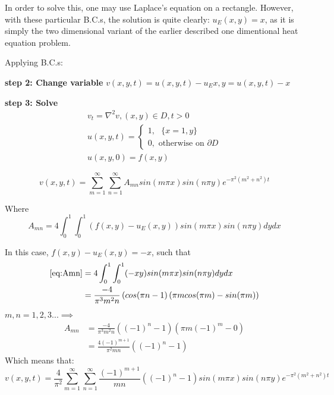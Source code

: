 \documentclass[%
oneside,                 %
final,                   %
10pt]{article}
\begin{document}
In order to solve this, one may use Laplace's equation on a rectangle. However, with these particular B.C.s, the solution is quite clearly:
$u_E(x,y)=x$, as it is simply the two dimensional variant of the earlier described one dimentional heat equation problem. \newline

Applying B.C.s: 


\textbf{step 2: Change variable}
$v(x,y,t)=u(x,y,t)-u_E{x,y}=u(x,y,t)-x$

\textbf{step 3: Solve}
\begin{align}
v_t=\nabla^2 v, (x,y) \in D, t>0 \\
u(x,y,t)=\begin{cases}
1, \text{	} \{x=1,y\} \\
0, \text{ otherwise on } \partial D
\end{cases} \\
u(x,y,0)=f(x,y)
\end{align}

\begin{equation}
v(x,y,t)=\sum_{m=1}^{\infty} \sum_{n=1}^{\infty} A_{mn} sin (m\pi x) sin (n \pi y) e^{-\pi^2(m^2+n^2)t}
\end{equation}

Where 
\begin{equation}
A_{mn}=4 \int_0^1 \int_0^1 \left( f(x,y)-u_E(x,y)\right) sin (m\pi x) sin (n \pi y) dy dx 
\label{eq:Amn}
\end{equation}

In this case, $f(x,y)-u_E(x,y)=-x$, such that\\
\begin{align}
\eqref{eq:Amn}&=4 \int_0^{1} \int_0^{1} (-xy) sin (m \pi x) sin (n \pi y) dy dx \\
&= \frac{-4}{\pi^3 m^2 n} \left(cos(\pi n-1\right) \left( \pi m cos(\pi m)-sin(\pi m)\right)
\end{align}
$m,n=1,2,3... \implies$
\begin{align}
A_{mn}&=\frac{-4}{\pi^3 m^2 n} \left( (-1)^n-1\right) \left( \pi m (-1)^m-0\right) \\
&=\frac{4  (-1)^{m+1}}{\pi^2 m n} \left((-1)^n-1\right) 
\end{align}
Which means that:
\begin{equation}
v(x,y,t)=\frac{4}{\pi^2}\sum_{m=1}^{\infty} \sum_{n=1}^{\infty} \frac{ (-1)^{m+1}}{ m n} \left((-1)^n-1\right) sin (m\pi x) sin (n \pi y) e^{-\pi^2(m^2+n^2)t}
\end{equation}
\end{document}
